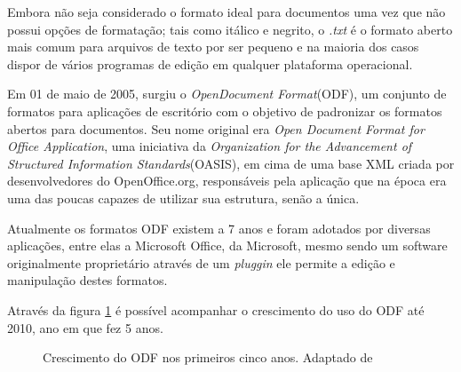 Embora não seja considerado o formato ideal para documentos uma vez que não possui opções de formatação; tais como itálico e negrito, o \textit{.txt} é o formato aberto mais comum para arquivos de texto por ser pequeno e na maioria dos casos dispor de vários programas de edição em qualquer plataforma operacional.

Em 01 de maio de 2005, surgiu o \textit{OpenDocument Format}(ODF), um conjunto de formatos para aplicações de escritório com o objetivo de padronizar os formatos abertos para documentos. Seu nome original era \textit{Open Document Format for Office Application}, uma iniciativa da \textit{Organization for the Advancement of Structured Information Standards}(OASIS), em cima de uma base XML criada por desenvolvedores do OpenOffice.org, responsáveis pela aplicação que na época era uma das poucas capazes de utilizar sua estrutura, senão a única.

Atualmente os formatos ODF existem a 7 anos e foram adotados por diversas aplicações, entre elas a Microsoft Office, da Microsoft, mesmo sendo um software originalmente proprietário através de um \textit{pluggin} ele permite a edição e manipulação destes formatos.

Através da figura \ref{crescimento_odf} é possível acompanhar o crescimento do uso do ODF até 2010, ano em que fez 5 anos.

\begin{figure}[ht]
    \centering
    \caption{Crescimento do ODF nos primeiros cinco anos. Adaptado de \cite{SILVA}}
    \label{crescimento_odf}
\end{figure}

